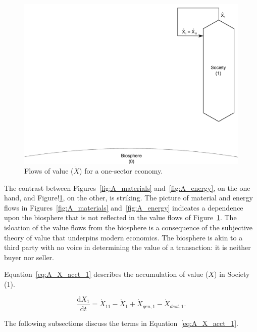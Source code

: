 \begin{figure}[!ht]
\centering
\includegraphics[width=0.8\linewidth]{Part_3/Chapter_Values/images/1_sector_value.pdf}
\caption[Flows of value for a one-sector economy]{Flows of value ($\dot{X}$) for a one-sector economy.}
\label{fig:A_value} 
\end{figure}

The contrast between Figures~\ref{fig:A_materials} and~\ref{fig:A_energy}, 
on the one hand, 
and Figure!\ref{fig:A_value}, 
on the other, is striking.  
The picture of material and energy flows in 
Figures~\ref{fig:A_materials} and~\ref{fig:A_energy} 
indicates a dependence upon the biosphere 
that is not reflected in the value flows of Figure~\ref{fig:A_value}.
The isloation of the value flows from the biosphere is a consequence
of the subjective theory of value 
that underpins modern economics.
The biosphere is akin to a third party with no voice 
in determining the value of a transaction:
it is neither buyer nor seller. 

Equation~\ref{eq:A_X_acct_1} describes the accumulation 
of value
($X$) in Society (1).

\begin{equation} \label{eq:A_X_acct_1}
	\frac{\mathrm{d}X_{1}}{\mathrm{d}t} 
	= \dot{X}_{11} 
	- \dot{X}_{1}
	+ \dot{X}_{gen,1}
	- \dot{X}_{dest,1}.
\end{equation}

\noindent{} The following subsections discuss the terms in Equation~\ref{eq:A_X_acct_1}.


